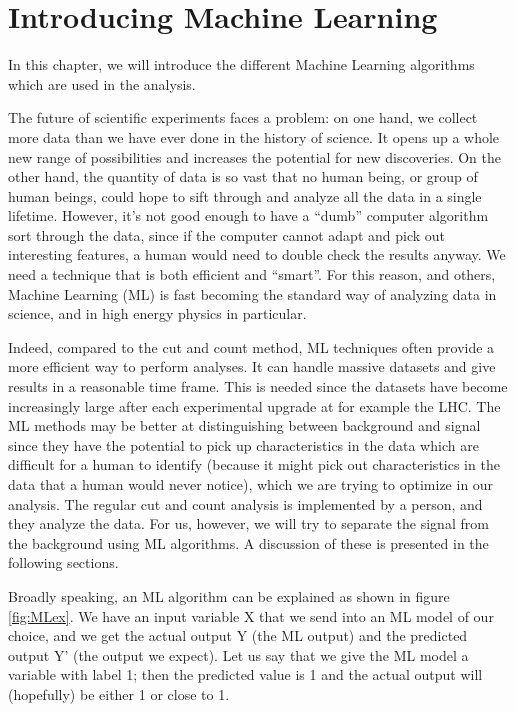 \chapter{Introducing Machine Learning}
\label{sec:ML}
In this chapter, we will introduce the different Machine Learning algorithms which are used in the analysis. 

The future of scientific experiments faces a problem: on one hand, we collect more data than we have ever done in the history of science. It opens up a whole new range of possibilities and increases the potential for new discoveries. On the other hand, the quantity of data is so vast that no human being, or group of human beings, could hope to sift through and analyze all the data in a single lifetime. However, it's not good enough to have a ``dumb'' computer algorithm sort through the data, since if the computer cannot adapt and pick out interesting features, a human would need to double check the results anyway. We need a technique that is both efficient and ``smart''. For this reason, and others, Machine Learning (ML) is fast becoming the standard way of analyzing data in science, and in high energy physics in particular. 

Indeed, compared to the cut and count method, ML techniques often provide a more efficient way to perform analyses. It can handle massive datasets and give results in a reasonable time frame. This is needed since the datasets have become increasingly large after each experimental upgrade at for example the LHC. The ML methods may be better at distinguishing between background and signal since they have the potential to pick up characteristics in the data which are difficult for a human to identify (because it might pick out characteristics in the data that a human would never notice), which we are trying to optimize in our analysis. The regular cut and count analysis is implemented by a person, and they analyze the data. For us, however, we will try to separate the signal from the background using ML algorithms. A discussion of these is presented in the following sections. 

Broadly speaking, an ML algorithm can be explained as shown in figure \ref{fig:MLex}. We have an input variable X that we send into an ML model of our choice, and we get the actual output Y (the ML output) and the predicted output Y' (the output we expect). Let us say that we give the ML model a variable with label 1; then the predicted value is 1 and the actual output will (hopefully) be either 1 or close to 1.   

